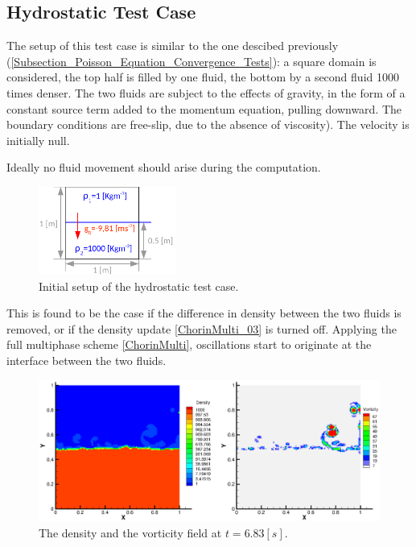 \documentclass[11pt, a4paper, oneside, openany]{book}
\begin{document}
\subsection{Hydrostatic Test Case}\label{Section_Hydrostatic_Test_Case}
The setup of this test case is similar to the one descibed previously (\ref{Subsection_Poisson_Equation_Convergence_Tests}): a square domain is considered, the top half is filled by one fluid, the bottom by a second fluid 1000 times denser. The two fluids are subject to the effects of gravity, in the form of a constant source term added to the momentum equation, pulling downward. The boundary conditions are free-slip, due to the absence of viscosity). The velocity is initially null.\par
Ideally no fluid movement should arise during the computation.
\begin{figure}[!ht]
	\centering
	\includegraphics[width=0.4\textwidth]{Hydrostatic_setup.pdf}
	\caption[Hydrostatic Test Case Setup]{Initial setup of the hydrostatic test case.}\label{HydrostaticSetup}
\end{figure}\noindent
This is found to be the case if the difference in density between the two fluids is removed, or if the density update \eqref{ChorinMulti_03} is turned off. Applying the full multiphase scheme \eqref{ChorinMulti}, oscillations start to originate at the interface between the two fluids.\par
\begin{figure}[!ht]
	\centering
	\includegraphics[width=1.1\textwidth]{HydrostaticT6p83.eps}
	\caption[Hydrostatic Test Density Viscosity]{The density and the vorticity field at $t = 6.83 [s]$.}\label{HydrostaticT6p83}
\end{figure}\noindent
\end{document}
